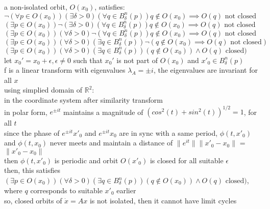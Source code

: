 \documentclass[12pt,letter]{article}
\newcommand{\R}{\mathbb{R}}
\begin{document}
\begin{itemize}
\begin{itemize}
  a non-isolated orbit, $O(x_0)$, satisfies:\\
  $\neg(\forall p \in O(x_0))(\exists \delta > 0)(\forall q \in B_{\delta}^n(p)) q \notin O(x_0) \implies O(q) \text{ not closed}$\\
  $(\exists p \in O(x_0))\neg(\exists \delta > 0)(\forall q \in B_{\delta}^n(p)) q \notin O(x_0) \implies O(q) \text{ not closed}$\\
  $(\exists p \in O(x_0))(\forall \delta > 0)\neg(\forall q \in B_{\delta}^n(p)) q \notin O(x_0) \implies O(q) \text{ not closed}$\\
  $(\exists p \in O(x_0))(\forall \delta > 0)(\exists q \in B_{\delta}^n(p)) \neg(q \notin O(x_0) \implies O(q) \text{ not closed})$\\
  $(\exists p \in O(x_0))(\forall \delta > 0)(\exists q \in B_{\delta}^n(p)) (q \notin O(x_0)) \wedge O(q) \text{ closed})$\\

  let $x_0'=x_0+\epsilon, \epsilon \neq 0$ such that $x_0'$ is not part of $O(x_0)$ and $x'_0 \in B_{\delta}^n(p)$\\

  f is a linear transform with eigenvalues $\lambda_A = \pm i$, the eigenvalues are invariant for all $x$\\

  using simplied domain of $\R^2$:\\
  in the coordinate system after similarity transform\\
  
  in polar form, $e^{\pm it}$ maintains a magnitude of $(cos^2(t)+sin^2(t))^{1/2}=1$, for all $t$\\
  
  since the phase of $e^{\pm it}x'_0$ and $e^{\pm it}x_0$ are in sync with a same period, $\phi(t,x'_0)$ and $\phi(t,x_0)$ never meets and maintain a distance of $\|e^{it}\|\|x'_0-x_0\|$ = $\|x'_0-x_0\|$\\

  then $\phi(t,x'_0)$ is periodic and orbit $O(x'_0)$ is closed for all suitable $\epsilon$\\

  then, this satisfies
  $(\exists p \in O(x_0))(\forall \delta > 0)(\exists q \in B_{\delta}^n(p)) (q \notin O(x_0)) \wedge O(q) \text{ closed})$, where $q$ corresponds to suitable $x'_0$ earlier\\

  so, closed orbits of $\dot{x}=Ax$ is not isolated, then it cannot have limit cycles\\


\end{itemize}
\end{itemize}
\end{document}
